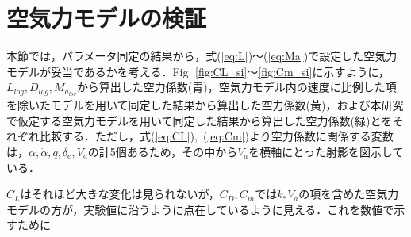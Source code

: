 \section{空気力モデルの検証}

本節では，パラメータ同定の結果から，式(\ref{eq:L})〜(\ref{eq:Ma})で設定した空気力モデルが妥当であるかを考える．Fig. \ref{fig:CL_si}〜\ref{fig:Cm_si}に示すように，$L_{log},D_{log},M_{a_{log}}$から算出した空力係数(青)，空気力モデル内の速度に比例した項を除いたモデルを用いて同定した結果から算出した空力係数(黃)，および本研究で仮定する空気力モデルを用いて同定した結果から算出した空力係数(緑)とをそれぞれ比較する．ただし，式(\ref{eq:CL}),~(\ref{eq:Cm})より空力係数に関係する変数は，$\alpha,\dot{\alpha},q,\delta_e,V_a$の計5個あるため，その中から$V_a$を横軸にとった射影を図示している．

$C_L$はそれほど大きな変化は見られないが，$C_D,C_m$では$k_* V_a$の項を含めた空気力モデルの方が，実験値に沿うように点在しているように見える．これを数値で示すために

